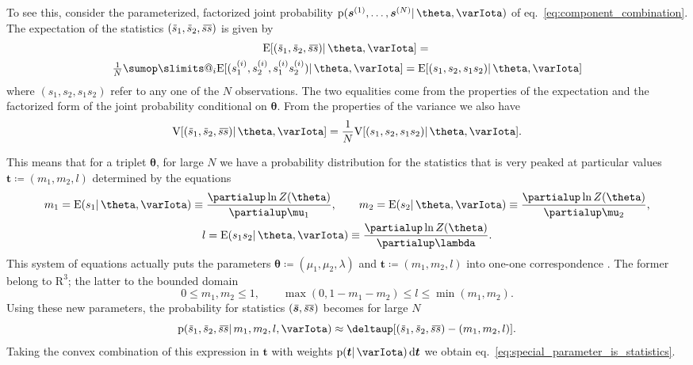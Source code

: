 \documentclass[\ifafour a4paper,12pt,\else a5paper,10pt,\fi%
onecolumn,oneside,article,%
british%
]{memoir}
\makeatletter
\theoremstyle{remark}
\theoremstyle{innote}
\def\sum{\DOTSI\sumop\slimits@}
\newcommand*{\citep}{\parencites}
\newcommand*{\de}{\partialup}%
\newcommand*{\delt}{\deltaup}%
\newcommand*{\di}{\mathrm{d}}%
\newcommand*{\RR}{\bm{\mathrm{R}}}
\newcommand*{\defd}{\coloneqq}
\renewcommand{\le}{\leqslant}%
\DeclarePairedDelimiter\clcl{[}{]}
\newcommand*{\pf}{\mathrm{p}}%
\renewcommand*{\|}{\mathpunct{|}}
\newcommand*{\eqn}{eq.}%
\newcommand*{\E}{\mathrm{E}}
\DeclarePairedDelimiter\expp{(}{)}
\newcommand*{\expe}{\E\expp}%
\newcommand*{\expeb}{\E\clcl}%
\newcommand*{\widebar}[1]{{\mkern1.5mu\skew{2}\overline{\mkern-1.5mu#1\mkern-1.5mu}\mkern 1.5mu}}
\newcommand*{\yI}{\varIota}
\newcommand*{\ys}{\bm{s}}
\newcommand*{\yso}[1]{\ys^{(#1)}}
\newcommand*{\ysso}[1]{s^{(#1)}}
\newcommand*{\la}{\lambda}
\newcommand*{\yth}{\bm{\theta}}
\newcommand*{\yt}{\bm{t}}
\newcommand*{\yav}{\widebar{\bm{s}}}
\newcommand*{\yavv}{\widebar{s}}
\newcommand*{\ycv}{\widebar{ss}}
\newcommand*{\V}{\mathrm{V}}
\newcommand*{\varb}{\V\clcl}%
\makeatother
\begin{document}
To see this, consider the parameterized, factorized joint probability
$\pf(\yso{1}, \dotsc, \yso{N} \|\yth, \yI )$ of
\eqn~\eqref{eq:component_combination}. The expectation of the statistics
$(\yavv_1,\yavv_2,\ycv)$ is given by
\begin{multline}
  \label{eq:expect_statistics}
  \expeb{(\yavv_1,\yavv_2,\ycv) \|\yth,\yI} ={}\\
  \tfrac{1}{N} \sum_{i}
  \expeb{(\ysso{i}_1,\ysso{i}_2,\ysso{i}_1 \ysso{i}_2) \|\yth,\yI}
  = \expeb{(s_1,s_2,s_1 s_2) \|\yth,\yI}
\end{multline}
where $(s_1,s_2,s_1 s_2)$ refer to any one of the $N$ observations. The two
equalities come from the properties of the expectation and the factorized
form of the joint probability conditional on $\yth$. From the properties of
the variance we also have
\begin{equation}
  \label{eq:variance_statistics}
  \varb{(\yavv_1,\yavv_2,\ycv) \|\yth,\yI}
  = \frac{1}{N} \varb{(s_1,s_2,s_1 s_2) \|\yth,\yI}.
\end{equation}

This means that for a triplet $\yth$, for large $N$ we have a probability
distribution for the statistics that is very peaked at particular values
$\yt \defd (m_1,m_2,l)$ determined by the equations
\begin{equation}
  \label{eq:change_coords}
  \begin{gathered}
    m_1 = \expe{s_1 \|\yth,\yI}
    \equiv \frac{\de\ln Z(\yth)}{\de \mu_1},
    \qquad
  m_2 = \expe{s_2 \|\yth,\yI}
    \equiv \frac{\de\ln Z(\yth)}{\de \mu_2},\\
  l = \expe{s_1 s_2\|\yth,\yI}
    \equiv \frac{\de\ln Z(\yth)}{\de\la}.
  \end{gathered}
\end{equation}
This system of equations actually puts the parameters
$\yth \defd(\mu_1, \mu_2, \la)$ and $\yt\defd(m_1, m_2,l)$ into one-one
correspondence \citep{meadetal1984}. The former belong to $\RR^3$; the
latter to the bounded domain
\begin{equation}
  \label{eq:domain_newcoords}
  0\le m_1,m_2 \le 1,
  \qquad
  \max(0,1-m_1-m_2) \le l \le \min(m_1,m_2).
\end{equation}
Using these new parameters, the probability for statistics $(\yav,\ycv)$
becomes for large $N$
\begin{equation}
  \label{eq:prob_stat_newparams}
  \pf(\yavv_1,\yavv_2,\ycv \|m_1,m_2,l,\yI)
  \approx \delt[(\yavv_1,\yavv_2,\ycv)- (m_1, m_2, l)].
\end{equation}
Taking the convex combination of this expression in $\yt$ with weights
$\pf(\yt \|\yI)\,\di\yt$ we obtain
\eqn~\eqref{eq:special_parameter_is_statistics}.
\end{document}
